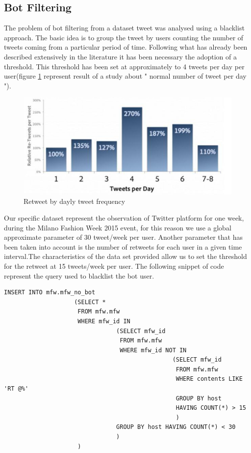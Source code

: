 \documentclass[conference, onecolumn]{IEEEtran}
\begin{document}
\subsection{Bot Filtering}
\medskip
The problem of bot filtering from a dataset tweet was analysed using a blacklist approach. The basic idea is to group the tweet by users counting the number of tweets coming from a particular period of time. Following what has already been described extensively in the literature it has been necessary the adoption of a threshold. This threshold has been set at approximately to 4 tweets per day per user(figure \ref{fig:tweeDay} represent result of a study about " normal number of tweet per day ").
\begin{figure} [!htbp]
	\centering
	\vspace{0.3cm}
	\includegraphics[scale=0.7]{images/daytweet}
	\caption{Retweet by dayly tweet frequency}
	\vspace{0.3cm}
	\label{fig:tweeDay}
\end{figure}
Our specific dataset represent the observation of Twitter platform for one week, during the Milano Fashion Week 2015 event, for this reason we use a global approximate parameter of 30 tweet/week per user. Another parameter that has been taken into account is the number of retweets for each user in a given time interval.The characteristics of the data set provided allow us to set the threshold for the retweet at 15 tweets/week per user.
\newpage
The following snippet of code represent the query used to blacklist the bot user.
\begin{lstlisting}
INSERT INTO mfw.mfw_no_bot
					(SELECT * 
					 FROM mfw.mfw 
					 WHERE mfw_id IN
								(SELECT mfw_id
								 FROM mfw.mfw
								 WHERE mfw_id NOT IN
												(SELECT mfw_id
												 FROM mfw.mfw
												 WHERE contents LIKE 'RT @%'
												 GROUP BY host
												 HAVING COUNT(*) > 15
												 )
								GROUP BY host HAVING COUNT(*) < 30
								)
					 )
\end{lstlisting}
\end{document}
